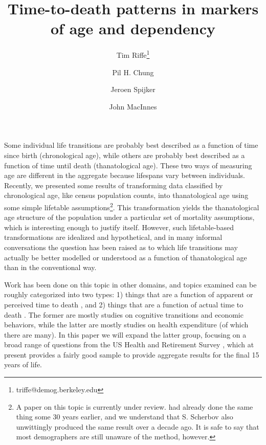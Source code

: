 \documentclass{article}
\begin{document}
\title{Time-to-death patterns in markers of age and dependency}

\author[1]{Tim Riffe\thanks{triffe@demog.berkeley.edu}}
\author[1]{Pil H. Chung}
\author[2,3]{Jeroen Spijker}
\author[4]{John MacInnes}

\maketitle

Some individual life transitions are probably best described as a function of
time since birth (chronological age), while others are probably best described as a
function of time until death (thanatological age). These two ways of
measuring age are different in the aggregate because lifespans vary between
individuals.
Recently, we presented some results of transforming
data classified by chronological age, like census population counts, into
thanatological age using some simple lifetable
assumptions\footnote{\citep{riffe2014paaposter} A paper on this topic is
currently under review. \citet{brouard1986structure, brouard1989mouvements}
had already done the same thing some 30 years earlier, and we understand that
S. Scherbov also unwittingly produced the same result over a decade ago. It is
safe to say that most demographers are still unaware of the method, however.}.
This transformation yields the thanatological age structure of the population
under a particular set of mortality assumptions, which is interesting enough to
justify itself.
However, such lifetable-based transformations are idealized and hypothetical, and in many informal
conversations the question has been raised as to which life transitions
may actually be better modelled or understood as a function of thanatological
age than in the conventional way.

Work has been done on this topic in other domains, and
topics examined can be roughly categorized into two types: 1) things that are a
function of apparent or perceived time to death
\citep{carstensen2006influence,gan2004subjective,salm2010subjective,van2010living}, and 2) things that are a function of actual time to death
\citep{miller2001increasing,seshamani2004longitudinal}. The former are mostly
studies on cognitive transitions and economic behaviors, while the latter are
mostly studies on health expenditure (of which there are many). In this paper we
will expand the latter group, focusing on a broad range of questions from the US
Health and Retirement Survey \citep{HRS}, which at present provides a fairly
good sample to provide aggregate results for the final 15 years of life.
\end{document}
